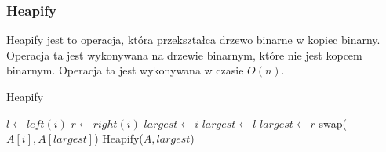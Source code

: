 \documentclass[11pt,a4paper]{article}
\begin{document}
\subsubsection{Heapify}
Heapify jest to operacja, która przekształca drzewo binarne w kopiec binarny. Operacja ta jest wykonywana na drzewie binarnym, które nie jest kopcem binarnym. Operacja ta jest wykonywana w czasie $O(n)$.
\begin{center}
    \begin{algorithm}
        \caption{Heapify}
        \begin{algorithmic}[1]
                \State $l \gets left(i)$
                \State $r \gets right(i)$
                \State $largest \gets i$
                    \State $largest \gets l$
                \EndIf
                    \State $largest \gets r$
                \EndIf
                    \State swap($A[i], A[largest]$)
                    \State Heapify($A, largest$)
                \EndIf
            \EndProcedure
        \end{algorithmic}
    \end{algorithm}
\end{center}
\end{document}
